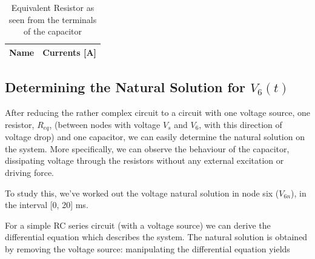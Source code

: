 \begin{table}[h]
  \centering
  \begin{tabular}{|l|r|}
    \hline    
    {\bf Name} & {\bf Currents [A]} \\ \hline
    
  \end{tabular}
  \caption{Equivalent Resistor as seen from the terminals of the capacitor}
  \label{tab:Req}
\end{table}



\clearpage
\subsection{Determining the Natural Solution for $V_6(t)$}

After reducing the rather complex circuit to a circuit with one voltage source, one resistor, $R_{eq}$, (between nodes with voltage $V_s$ and $V_6$, with this direction of voltage drop) and one capacitor, we can easily determine the natural solution on the system. More specifically, we can observe the behaviour of the capacitor, dissipating voltage through the resistors without any external excitation or driving force. 

To study this, we've worked out the voltage natural solution in node six ($V_{6n}$), in the interval [0, 20] ms.

For a simple RC series circuit (with a voltage source) we can derive the differential equation which describes the system. The natural solution is obtained by removing the voltage source: manipulating the differential equation yields 






